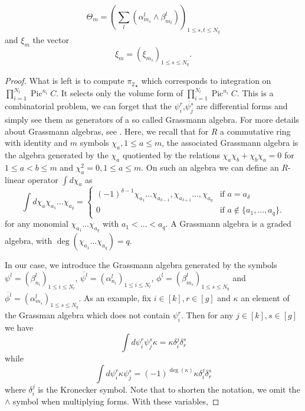 \documentclass{article}
\theoremstyle{definition}
\DeclareMathOperator{\pic}{\text{Pic}}
\newcommand{\ov}[1]{\overline{#1}}
\renewcommand{\leq}{\leqslant}
\begin{document}
\begin{equation}
\label{eq:bigtheta}
\Theta_m=\left( \sum_l \left( {\alpha}^l_{m_s} \wedge {\beta}^l_{m_t} \right) \right)_{1\leq s,t \leq {N_q}}
\end{equation}
and $\xi_m$ the vector 
\begin{equation}
\label{eq:xivect}
\xi_m=\left(\xi_{m_s}\right)_{1\leq s\leq {N_q}}.
\end{equation}


\mainqhmulti*


\begin{proof}
What is left is to compute ${\pi_2}_\star$ which corresponds to integration on $\prod_{i=1}^{N_l} \pic^{n_i} C$. It selects only the volume form of $\prod_{i=1}^{N_l} \pic^{n_i} C$. This is a combinatorial problem, we can forget that the $\psi_i^r$,$\ov{\psi^s_j}$ are differential forms and simply see them as generators of a so called Grassmann algebra. For more details about Grassmann algebras, see \cite{Berezin_1987,Caracciolo_Sokal_Sportiello_2013}. Here, we recall that for $R$ a commutative ring with identity and $m$ symbols $\chi_a, 1 \leq a \leq m$, the associated Grassmann algebra is the algebra generated by the $\chi_a$ quotiented by the relations $\chi_a \chi_b + \chi_b \chi_a = 0$ for $1\leq a < b \leq m$ and $\chi_a^2=0, 1\leq a \leq m$. On such an algebra we can define an $R$-linear operator $\int d \chi_a$ as 
 $$\int d\chi_a \chi_{a_1}\dots \chi_{a_q}=
\begin{cases}
    (-1)^{\delta-1} \chi_{a_1}\dots \chi_{a_{\delta-1}},\chi_{a_{\delta+1}}\dots, \chi_{a_q} &\text{if } a = a_\delta \\
    0 & \text{if } a \notin \lbrace a_1,\dots, a_q\rbrace.
\end{cases}
$$ for any monomial $\chi_{a_1}\dots \chi_{a_q}$ with $a_1 <\dots < a_q$. A Grassmann algebra is a graded algebra, with $\deg\left(\chi_{a_1}\dots \chi_{a_q}\right)=q$.


In our case, we introduce the Grassmann algebra generated by the symbols $\psi^l=(\beta_{n_i}^l)_{1\leq i \leq {N_l}}$, $\ov{\psi^l}=(\alpha_{n_i}^l)_{1\leq i \leq {N_l}}$, $\phi^l=({\beta}_{m_s}^l)_{1\leq s \leq {N_q}}$ and $\ov{\phi^l}=({\alpha}_{m_s}^l)_{1\leq s \leq {N_q}}$. As an example, fix $i\in[k],r\in[g]$ and $\kappa$ an element of the Grassman algebra which does not contain $\psi_i^r$. Then for any $j \in[k],s\in[g]$ we have $$\int d{\psi^r_i} \psi^s_{j} \kappa  = \kappa \delta_i^j \delta_r^s$$ while $$\int d{\psi^r_i} \kappa \psi^s_{j}   = (-1)^{\deg(\kappa)} \kappa \delta_i^j \delta_r^s$$
where $\delta_i^j$ is the Kronecker symbol. Note that to shorten the notation, we omit the $\wedge$ symbol when multiplying forms. With these variables, 


\end{proof}
\end{document}
